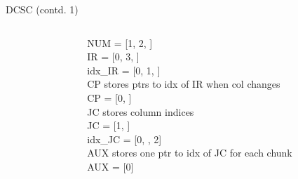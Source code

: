 \documentclass[12pt, usenames, dvipsnames, table]{beamer}
\begin{document}
\begin{frame}[fragile]{DCSC (contd. 1)}
\begin{columns}
\begin{column}{0.5\textwidth}
\end{column}
\begin{column}{0.5\textwidth}  %
\begin{center}
	NUM = [1, 2, \hspace{0.5cm}  \hspace{0.5cm}] \\
	\vspace{0.3cm}
    IR  = [0, 3, \hspace{0.5cm}\hspace{0.5cm}] \\
    \vspace{0.1cm}
	idx\_IR = [0, 1, \hspace{0.5cm}\hspace{0.5cm}] \\
	\vspace{0.2cm}
    CP stores ptrs to idx of IR when col changes \\
    CP = [0, \hspace{0.5cm}\hspace{0.5cm}] \\
	\vspace{0.3cm}
	JC stores column indices \\
    JC = [1, \hspace{0.5cm}\hspace{0.5cm}] \\
	\vspace{0.3cm}
	idx\_JC = [0, \hspace{0.5cm}\hspace{0.5cm}, 2] \\
	\vspace{0.3cm}
	AUX stores one ptr to idx of JC for each chunk\\
	AUX = [0] \\
\end{center}
	
\end{column}
\end{columns}
\end{frame}
\end{document}
